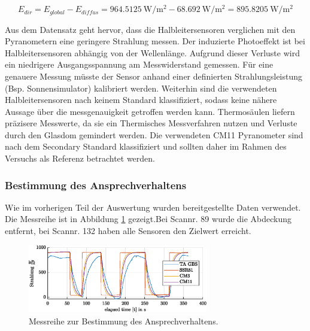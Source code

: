 \begin{equation}
	\label{eq:Edir}
	E_{dir}=E_{global}-E_{diffus}=\SI{964.5125}{\watt\per\square\meter}-\SI{68.692}{\watt\per\square\meter} = \SI{895.8205}{\watt\per\square\meter}
\end{equation}

Aus dem Datensatz geht hervor, dass die Halbleitersensoren verglichen mit den Pyranometern eine geringere Strahlung messen. Der induzierte Photoeffekt ist bei Halbleitersensoren abhängig von der Wellenlänge. Aufgrund dieser Verluste wird ein niedrigere Ausgangsspannung am Messwiderstand gemessen. Für eine genauere Messung müsste der Sensor anhand einer definierten Strahlungsleistung (Bsp. Sonnensimulator) kalibriert werden. Weiterhin sind die verwendeten Halbleitersensoren nach keinem Standard klassifiziert, sodass keine nähere Aussage über die messgenauigkeit getroffen werden kann. Thermosäulen liefern präzisere Messwerte, da sie ein Thermisches Messverfahren nutzen und Verluste durch den Glasdom gemindert werden. Die verwendeten CM11 Pyranometer sind nach dem Secondary Standard klassifiziert und sollten daher im Rahmen des Versuchs als Referenz betrachtet werden.


\subsubsection{Bestimmung des Ansprechverhaltens}
Wie im vorherigen Teil der Auswertung wurden bereitgestellte Daten verwendet. Die Messreihe ist in Abbildung \ref{fig:response} gezeigt.Bei Scannr. 89 wurde die Abdeckung entfernt, bei Scannr. 132 haben alle Sensoren den Zielwert erreicht.
\begin{figure}[H]
	\centering
	\includegraphics[width=0.7\textwidth]{../DATA/Messreihe_Ansprechzeit.eps}
	\caption[Messreihe zur Bestimmung des Ansprechverhaltens.]{Messreihe zur Bestimmung des Ansprechverhaltens.}
	\label{fig:response}
\end{figure}

